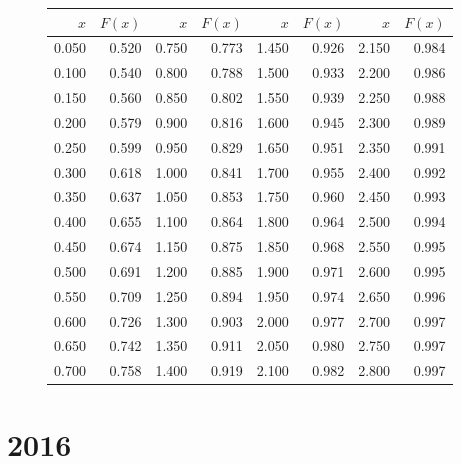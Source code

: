 \documentclass[addpoints, answers]{exam} %
\begin{document}
\begin{figure}[b]
\begin{minipage}[b]{0.35\linewidth}
\begin{tikzpicture}
\end{tikzpicture}
\par\vspace{0pt}
  \end{minipage}%
  \begin{minipage}[b]{0.60\linewidth}
    \centering
\begin{tabular}{rr|rr|rr|rr}
  \hline
$x$ & $F(x)$ & $x$ & $F(x)$ & $x$ & $F(x)$ & $x$ & $F(x)$ \\ 
  \hline
0.050 & 0.520 & 0.750 & 0.773 & 1.450 & 0.926 & 2.150 & 0.984 \\ 
  0.100 & 0.540 & 0.800 & 0.788 & 1.500 & 0.933 & 2.200 & 0.986 \\ 
  0.150 & 0.560 & 0.850 & 0.802 & 1.550 & 0.939 & 2.250 & 0.988 \\ 
  0.200 & 0.579 & 0.900 & 0.816 & 1.600 & 0.945 & 2.300 & 0.989 \\ 
  0.250 & 0.599 & 0.950 & 0.829 & 1.650 & 0.951 & 2.350 & 0.991 \\ 
  0.300 & 0.618 & 1.000 & 0.841 & 1.700 & 0.955 & 2.400 & 0.992 \\ 
  0.350 & 0.637 & 1.050 & 0.853 & 1.750 & 0.960 & 2.450 & 0.993 \\ 
  0.400 & 0.655 & 1.100 & 0.864 & 1.800 & 0.964 & 2.500 & 0.994 \\ 
  0.450 & 0.674 & 1.150 & 0.875 & 1.850 & 0.968 & 2.550 & 0.995 \\ 
  0.500 & 0.691 & 1.200 & 0.885 & 1.900 & 0.971 & 2.600 & 0.995 \\ 
  0.550 & 0.709 & 1.250 & 0.894 & 1.950 & 0.974 & 2.650 & 0.996 \\ 
  0.600 & 0.726 & 1.300 & 0.903 & 2.000 & 0.977 & 2.700 & 0.997 \\ 
  0.650 & 0.742 & 1.350 & 0.911 & 2.050 & 0.980 & 2.750 & 0.997 \\ 
  0.700 & 0.758 & 1.400 & 0.919 & 2.100 & 0.982 & 2.800 & 0.997 \\ 
   \hline
\end{tabular}
\par\vspace{0pt}
\end{minipage}
\label{fig:test}
\end{figure}

\newpage
\section{2016}
\end{document}
